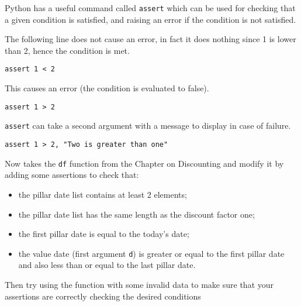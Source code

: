 \begin{question}
Python has a useful command called \texttt{assert} which can be used for checking that a given condition is satisfied, and raising an error if the condition is not satisfied.

The following line does not cause an error, in fact it does nothing since 1 is lower than 2, hence the condition is met.

\lstinline[language=iPython]|assert 1 < 2|

\noindent
This causes an error (the condition is evaluated to false). 

\lstinline[language=iPython]|assert 1 > 2|

\noindent
\texttt{assert} can take a second argument with a message to display in case of failure.

\lstinline[language=iPython]|assert 1 > 2, "Two is greater than one"|

\noindent
Now takes the \texttt{df} function from the Chapter on Discounting and modify it by adding some assertions to check that:

\begin{itemize}
\item the pillar date list contains at least 2 elements;
\item the pillar date list has the same length as the discount factor one;
\item the first pillar date is equal to the today's date;
\item the value date (first argument \texttt{d}) is greater or equal to the first pillar date and also less than or equal to the last pillar date.
\end{itemize}

Then try using the function with some invalid data to make sure that your assertions are correctly checking the desired conditions
\end{question}


